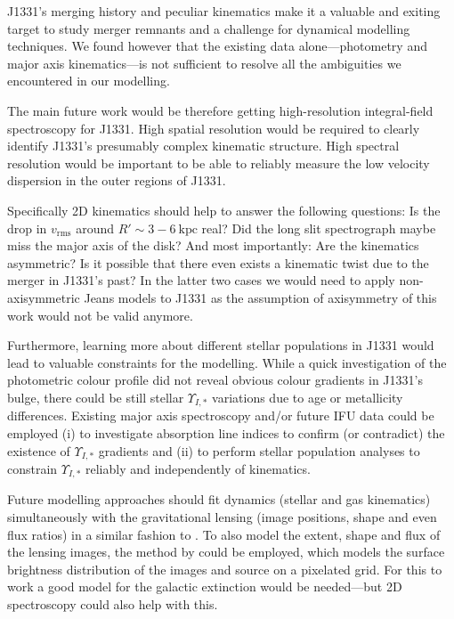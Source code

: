 \documentclass[useAMS,usenatbib]{mnras}
\begin{document}
J1331's merging history and peculiar kinematics make it a valuable and exiting target to study merger remnants and a challenge for dynamical modelling techniques. We found however that the existing data alone---photometry and major axis kinematics---is not sufficient to resolve all the ambiguities we encountered in our modelling.

The main future work would be therefore getting high-resolution integral-field spectroscopy for J1331. High spatial resolution would be required to clearly identify J1331's presumably complex kinematic structure. High spectral resolution would be important to be able to reliably measure the low velocity dispersion in the outer regions of J1331.

Specifically 2D kinematics should help to answer the following questions: Is the drop in $v_\text{rms}$ around $R' \sim 3-6~\text{kpc}$ real? Did the long slit spectrograph maybe miss the major axis of the disk? And most importantly: Are the kinematics asymmetric? Is it possible that there even exists a kinematic twist due to the merger in J1331's past? In the latter two cases we would need to apply non-axisymmetric Jeans models to J1331 as the assumption of axisymmetry of this work would not be valid anymore.

Furthermore, learning more about different stellar populations in J1331 would lead to valuable constraints for the modelling. While a quick investigation of the photometric colour profile did not reveal obvious colour gradients in J1331's bulge, there could be still stellar $\Upsilon_{I,*}$ variations due to age or metallicity differences. Existing major axis spectroscopy and/or future IFU data could be employed (i) to investigate absorption line indices to confirm (or contradict) the existence of $\Upsilon_{I,*}$ gradients and (ii) to perform stellar population analyses to constrain $\Upsilon_{I,*}$ reliably and independently of kinematics.

Future modelling approaches should fit dynamics (stellar and gas kinematics) simultaneously with the gravitational lensing (image positions, shape and even flux ratios) in a similar fashion to \citet{SWELLSIV}. To also model the extent, shape and flux of the lensing images, the method by \citet{2004ApJ...611..739T,2003ApJ...590..673W} could be employed, which models the surface brightness distribution of the images and source on a pixelated grid. For this to work a good model for the galactic extinction would be needed---but 2D spectroscopy could also help with this.
\end{document}
